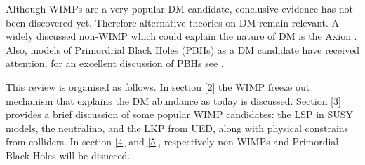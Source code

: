 Although WIMPs are a very popular DM candidate, conclusive evidence has not been discovered yet. Therefore alternative theories on DM remain relevant. A widely discussed non-WIMP which could explain the nature of DM is the Axion \cite{Saikawa:2017lzn}. Also, models of Primordrial Black Holes (PBHs) as a DM candidate have received attention, for an excellent discussion of PBHs see \cite{Ali-Haimoud:2017rtz}.

This review is organised as follows. In section \ref{2} the WIMP freeze out mechanism that explains the DM abundance as today is discussed. Section \ref{3} provides a brief discussion of some popular WIMP candidates: the LSP in SUSY models, the neutralino, and the LKP from UED, along with physical constrains from colliders. In section \ref{4} and \ref{5}, respectively non-WIMPs  and Primordial Black Holes will be disucced.